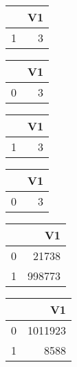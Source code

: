 \bigskip\bigskip
\centering
\begin{tabular}{rr}
  \hline
 & V1 \\ 
  \hline
1 &   3 \\ 
   \hline
\end{tabular}

\bigskip\bigskip
\centering
\begin{tabular}{rr}
  \hline
 & V1 \\ 
  \hline
0 &   3 \\ 
   \hline
\end{tabular}

\bigskip\bigskip
\centering
\begin{tabular}{rr}
  \hline
 & V1 \\ 
  \hline
1 &   3 \\ 
   \hline
\end{tabular}

\bigskip\bigskip
\centering
\begin{tabular}{rr}
  \hline
 & V1 \\ 
  \hline
0 &   3 \\ 
   \hline
\end{tabular}

\bigskip\bigskip
\centering
\begin{tabular}{rr}
  \hline
 & V1 \\ 
  \hline
0 & 21738 \\ 
  1 & 998773 \\ 
   \hline
\end{tabular}

\bigskip\bigskip
\centering
\begin{tabular}{rr}
  \hline
 & V1 \\ 
  \hline
0 & 1011923 \\ 
  1 & 8588 \\ 
   \hline
\end{tabular}

